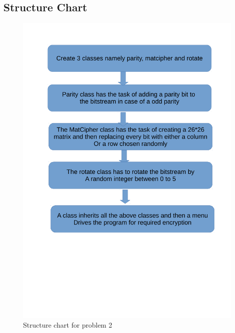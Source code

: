 \documentclass[11pt]{report}
\begin{document}
	\subsection{Structure Chart}
	\begin{figure}[h!]
	\centering
	\includegraphics[scale=0.7]{images/shots22}
	\caption{Structure chart for problem 2}	
	\end{figure}
	\pagebreak
\end{document}
